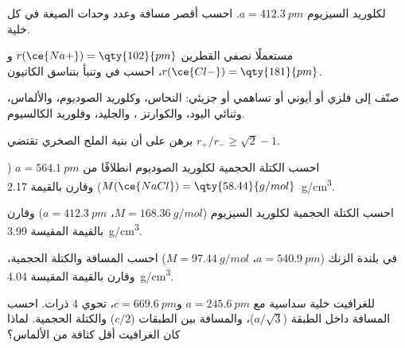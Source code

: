 \begin{exercise}[$\star$]\label{exo:b1:crystals-ionic-covalent:2}
لكلوريد السيزيوم $a = \qty{412.3}{pm}$. احسب أقصر مسافة
 وعدد وحدات الصيغة في كل خلية.
\end{exercise}

\begin{exercise}[$\star$]\label{exo:b1:crystals-ionic-covalent:3}
مستعملًا نصفي القطرين $r(\ce{Na+}) = \qty{102}{pm}$ و$r(\ce{Cl-}) =
\qty{181}{pm}$، احسب  في  وتنبأ
بتناسق الكاتيون.
\end{exercise}

\begin{exercise}[$\star$]\label{exo:b1:crystals-ionic-covalent:4}
صنّف إلى فلزي أو أيوني أو تساهمي أو جزيئي: النحاس، وكلوريد
الصوديوم، والألماس، وثنائي اليود، والكوارتز ، والجليد، وفلوريد الكالسيوم.
\end{exercise}

\begin{exercise}[$\star\star$]\label{exo:b1:crystals-ionic-covalent:5}
برهن على أن بنية الملح الصخري تقتضي $r_+/r_- \ge \sqrt2 - 1$.
\end{exercise}

\begin{exercise}[$\star\star$]\label{exo:b1:crystals-ionic-covalent:6}
احسب الكتلة الحجمية لكلوريد الصوديوم انطلاقًا من $a = \qty{564.1}{pm}$
($M(\ce{NaCl}) = \qty{58.44}{g/mol}$) وقارن بالقيمة
\qty{2.17}{g/cm^3}.
\end{exercise}

\begin{exercise}[$\star\star$]\label{exo:b1:crystals-ionic-covalent:7}
احسب الكتلة الحجمية لكلوريد السيزيوم ($M = \qty{168.36}{g/mol}$،
$a = \qty{412.3}{pm}$) وقارن بالقيمة المقيسة \qty{3.99}{g/cm^3}.
\end{exercise}

\begin{exercise}[$\star\star$]\label{exo:b1:crystals-ionic-covalent:8}
في بلندة الزنك ($a = \qty{540.9}{pm}$، $M = \qty{97.44}{g/mol}$) احسب
المسافة  والكتلة الحجمية، وقارن بالقيمة المقيسة
\qty{4.04}{g/cm^3}.
\end{exercise}

\begin{exercise}[$\star\star$]\label{exo:b1:crystals-ionic-covalent:9}
للغرافيت خلية سداسية مع $a = \qty{245.6}{pm}$
و$c = \qty{669.6}{pm}$، تحوي 4 ذرات. احسب المسافة 
داخل الطبقة ($a/\sqrt3$)، والمسافة بين الطبقات ($c/2$)
والكتلة الحجمية. لماذا كان الغرافيت أقل كثافة من الألماس؟
\end{exercise}


